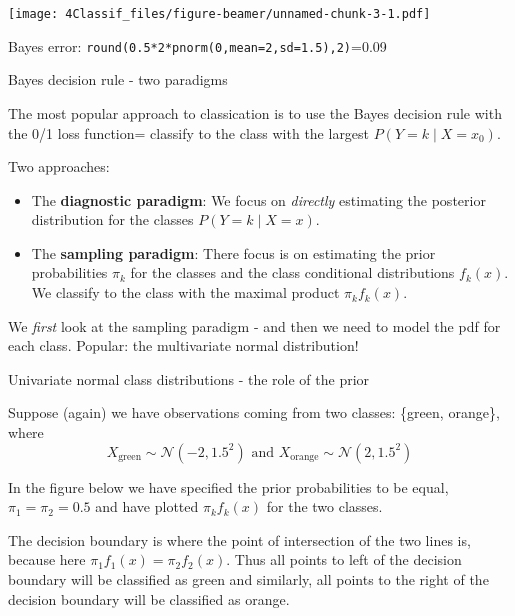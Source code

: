 \documentclass[10pt,ignorenonframetext,]{beamer}
\begin{document}
\begin{frame}[fragile]

\texttt{[image: 4Classif\_files/figure-beamer/unnamed-chunk-3-1.pdf]}

Bayes error: \texttt{round(0.5*2*pnorm(0,mean=2,sd=1.5),2)}=0.09

\end{frame}

\begin{frame}

\begin{block}{Bayes decision rule - two paradigms}

The most popular approach to classication is to use the Bayes decision
rule with the 0/1 loss function= classify to the class with the largest
\(P(Y=k\mid X=x_0)\).

Two approaches:

\begin{itemize}
\item
  The \textbf{diagnostic paradigm}: We focus on \emph{directly}
  estimating the posterior distribution for the classes
  \(P(Y=k \mid X=x)\).
\item
  The \textbf{sampling paradigm}: There focus is on estimating the prior
  probabilities \(\pi_k\) for the classes and the class conditional
  distributions \(f_k(x)\). We classify to the class with the maximal
  product \(\pi_k f_k(x)\).
\end{itemize}

We \emph{first} look at the sampling paradigm - and then we need to
model the pdf for each class. Popular: the multivariate normal
distribution!

\end{block}

\end{frame}

\begin{frame}

\begin{block}{Univariate normal class distributions - the role of the
prior}

Suppose (again) we have observations coming from two classes: \{{green},
{orange}\}, where
\[X_{\text{green}}\sim \mathcal{N}(-2, 1.5^2) \text{ and }
X_{\text{orange}}\sim \mathcal{N}(2, 1.5^2) \]

In the figure below we have specified the prior probabilities to be
equal, \(\pi_1 = \pi_2 = 0.5\) and have plotted \(\pi_k f_k(x)\) for the
two classes.

The decision boundary is where the point of intersection of the two
lines is, because here \(\pi_1 f_1(x)=\pi_2 f_2(x)\). Thus all points to
left of the decision boundary will be classified as green and similarly,
all points to the right of the decision boundary will be classified as
orange.

\end{block}

\end{frame}
\end{document}
